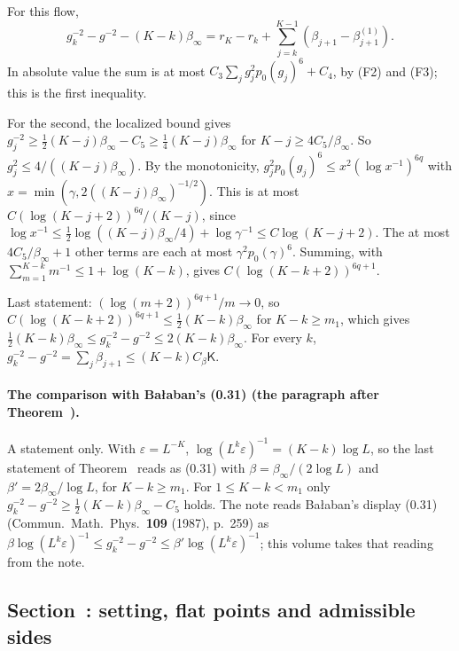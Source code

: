 \begin{step}
For this flow,
\[
g_k^{-2}-g^{-2}-(K-k)\beta_\infty=r_K-r_k+\sum_{j=k}^{K-1}(\beta_{j+1}-\beta^{(1)}_{j+1}).
\]
In absolute value the sum is at most $C_3\sum_jg_j^2p_0(g_j)^6+C_4$, by (F2) and (F3); this is the first inequality.

For the second, the localized bound gives $g_j^{-2}\ge\frac12(K-j)\beta_\infty-C_5\ge\frac14(K-j)\beta_\infty$ for $K-j\ge4C_5/\beta_\infty$. So $g_j^2\le4/((K-j)\beta_\infty)$. By the monotonicity, $g_j^2p_0(g_j)^6\le x^2(\log x^{-1})^{6q}$ with $x=\min(\gamma,2((K-j)\beta_\infty)^{-1/2})$. This is at most $C(\log(K-j+2))^{6q}/(K-j)$, since $\log x^{-1}\le\frac12\log((K-j)\beta_\infty/4)+\log\gamma^{-1}\le C\log(K-j+2)$. The at most $4C_5/\beta_\infty+1$ other terms are each at most $\gamma^2p_0(\gamma)^6$. Summing, with $\sum_{m=1}^{K-k}m^{-1}\le1+\log(K-k)$, gives $C(\log(K-k+2))^{6q+1}$.

Last statement: $(\log(m+2))^{6q+1}/m\to0$, so $C(\log(K-k+2))^{6q+1}\le\frac12(K-k)\beta_\infty$ for $K-k\ge m_1$, which gives $\frac12(K-k)\beta_\infty\le g_k^{-2}-g^{-2}\le2(K-k)\beta_\infty$. For every $k$, $g_k^{-2}-g^{-2}=\sum_j\beta_{j+1}\le(K-k)C_\beta\mathsf K$.
\end{step}

\paragraph{The comparison with Ba\l aban's (0.31) (the paragraph after Theorem~).} A statement only. With $\varepsilon=L^{-K}$, $\log(L^k\varepsilon)^{-1}=(K-k)\log L$, so the last statement of Theorem~ reads as (0.31) with $\beta=\beta_\infty/(2\log L)$ and $\beta'=2\beta_\infty/\log L$, for $K-k\ge m_1$. For $1\le K-k<m_1$ only $g_k^{-2}-g^{-2}\ge\frac12(K-k)\beta_\infty-C_5$ holds. The note reads Ba\l aban's display (0.31) (Commun.\ Math.\ Phys.\ \textbf{109} (1987), p.~259) as $\beta\log(L^k\varepsilon)^{-1}\le g_k^{-2}-g^{-2}\le\beta'\log(L^k\varepsilon)^{-1}$; this volume takes that reading from the note.

\subsection{Section~\texorpdfstring{}{59}: setting, flat points and admissible sides}\label{d11b:59a}

